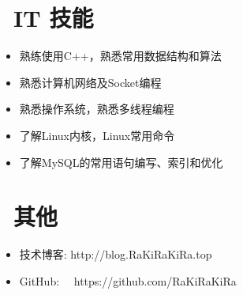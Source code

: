 \documentclass{resume}
\begin{document}
\section{\faCogs\ IT 技能}
\begin{itemize}[parsep=0.5ex]
  \item 熟练使用C++，熟悉常用数据结构和算法
  \item 熟悉计算机网络及Socket编程
  \item 熟悉操作系统，熟悉多线程编程
  \item 了解Linux内核，Linux常用命令
  \item 了解MySQL的常用语句编写、索引和优化
\end{itemize}


\section{\faInfo\ 其他}
\begin{itemize}[parsep=0.5ex]
  \item 技术博客: http://blog.RaKiRaKiRa.top
  \item GitHub:  \,\,\, \,https://github.com/RaKiRaKiRa
\end{itemize}

%
%
\end{document}
